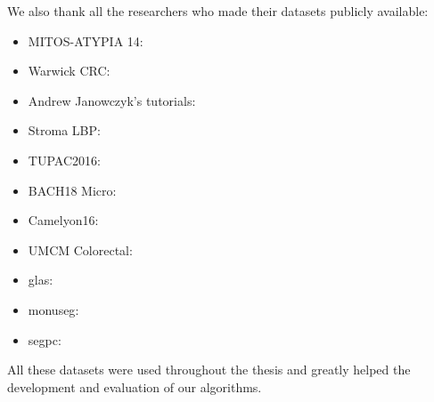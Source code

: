 We also thank all the researchers who made their datasets publicly available:

\begin{itemize}
  \item MITOS-ATYPIA 14: \citeauthor{roux2014mitos} \cite{roux2014mitos}
  \item Warwick CRC: \citeauthor{sirinukunwattana2016locality} \cite{sirinukunwattana2016locality}
  \item Andrew Janowczyk's tutorials: \citeauthor{janowczyk2016deep} \cite{janowczyk2016deep}  
  \item Stroma LBP: \citeauthor{linder2012identification} \cite{linder2012identification}
  \item TUPAC2016: \citeauthor{veta2019predicting} \cite{veta2019predicting}
  \item BACH18 Micro: \citeauthor{aresta2019bach} \cite{aresta2019bach}
  \item Camelyon16: \citeauthor{bejnordi2017diagnostic} \cite{bejnordi2017diagnostic}
  \item UMCM Colorectal: \citeauthor{kather2016multi} \cite{kather2016multi}
  \item \acrshort{glas}: \citeauthor{sirinukunwattana2017gland} \cite{sirinukunwattana2017gland}
  \item \acrshort{monuseg}: \citeauthor{kumar2019multi} \cite{kumar2019multi}
  \item \acrshort{segpc}: \citeauthor{gupta2021segpc} \cite{gupta2021segpc}
\end{itemize}

All these datasets were used throughout the thesis and greatly helped the development and evaluation of our algorithms.